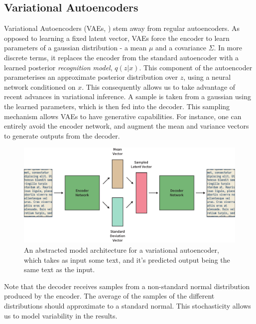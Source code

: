 \documentclass[12pt,twoside]{report}
\begin{document}
\subsection{Variational Autoencoders}
\label{variational_autoencoders}


Variational Autoencoders (VAEs, \cite{kingma_auto-encoding_2013}) stem away from regular autoencoders. As opposed to learning a fixed latent vector, VAEs force the encoder to learn parameters of a gaussian distribution - a mean $\mu$ and a covariance $\Sigma$. In more discrete terms, it replaces the encoder from the standard autoencoder with a learned posterior \textit{recognition model}, $q(z|x)$. This component of the autoencoder parameterises an approximate posterior distribution over $z$, using a neural network conditioned on $x$. This consequently allows us to take advantage of recent advances in variational inference.  A sample is taken from a gaussian using the learned parameters, which is then fed into the decoder. This sampling mechanism allows VAEs to have generative capabilities. For instance, one can entirely avoid the encoder network, and augment the mean and variance vectors to generate outputs from the decoder.

\begin{figure}[!ht]
	\centering
	\includegraphics[width=150mm]{diagrams/variational_autoencoders.pdf}
	\caption{An abstracted model architecture for a variational autoencoder, which takes as input some text, and it's predicted output being the same text as the input.\label{vae}}
  \end{figure}

Note that the decoder receives samples from a non-standard normal distribution produced by the encoder. The average of the samples of the different distributions should approximate to a standard normal. This stochasticity allows us to model variability in the results. 
\end{document}
